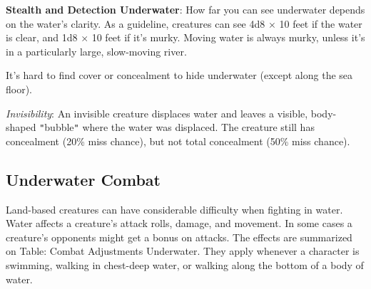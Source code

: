 \textbf{Stealth and Detection Underwater}: How far you can see underwater depends on the water's clarity. As a guideline, creatures can see 4d8 \mbox{$\times$} 10 feet if the water is clear, and 1d8 \mbox{$\times$} 10 feet if it's murky. Moving water is always murky, unless it's in a particularly large, slow-moving river.
				
It's hard to find cover or concealment to hide underwater (except along the sea floor).
				
\textit{Invisibility}: An invisible creature displaces water and leaves a visible, body-shaped \texttt{{}"{}}bubble\texttt{{}"{}} where the water was displaced. The creature still has concealment (20\% miss chance), but not total concealment (50\% miss chance).
				
\subsection{Underwater Combat}

				
Land-based creatures can have considerable difficulty when fighting in water. Water affects a creature's attack rolls, damage, and movement. In some cases a creature's opponents might get a bonus on attacks. The effects are summarized on Table: Combat Adjustments Underwater. They apply whenever a character is swimming, walking in chest-deep water, or walking along the bottom of a body of water. 
				
